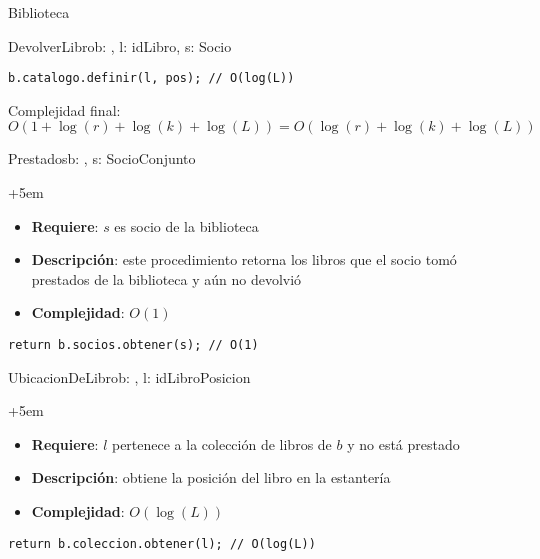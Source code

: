 \begin{module}{Biblioteca}{}{}{}
\begin{proc}{DevolverLibro}{\Inout b: \moduletype, \In l: idLibro, \In s: Socio}{}
\begin{lstlisting}[numbers=none,frame=none]
		b.catalogo.definir(l, pos); // O(log(L))
		\end{lstlisting}
		Complejidad final: $O(1 + \log(r) + \log(k) + \log(L)) = O(\log(r) + \log(k) + \log(L))$
	\end{proc}

	\begin{proc}{Prestados}{\Inout b: \moduletype, \In s: Socio}{Conjunto}
		\begin{adjustwidth}{+5em}{}
			\begin{itemize}
				\item \textbf{Requiere}: $s$ es socio de la biblioteca
				\item \textbf{Descripción}: este procedimiento retorna los libros que el socio tomó prestados de la biblioteca y aún no devolvió
				\item \textbf{Complejidad}: $O(1)$
			\end{itemize}
		\end{adjustwidth}

		\begin{lstlisting}[numbers=none,frame=none]
		return b.socios.obtener(s); // O(1)
		\end{lstlisting}
	\end{proc}

	\begin{proc}{UbicacionDeLibro}{\Inout b: \moduletype, \In l: idLibro}{Posicion}
		\begin{adjustwidth}{+5em}{}
			\begin{itemize}
				\item \textbf{Requiere}: $l$ pertenece a la colección de libros de $b$ y no está prestado
				\item \textbf{Descripción}: obtiene la posición del libro en la estantería
				\item \textbf{Complejidad}: $O(\log(L))$
			\end{itemize}
		\end{adjustwidth}

		\begin{lstlisting}[numbers=none,frame=none]
		return b.coleccion.obtener(l); // O(log(L))
		\end{lstlisting}
	\end{proc}

\end{module}


